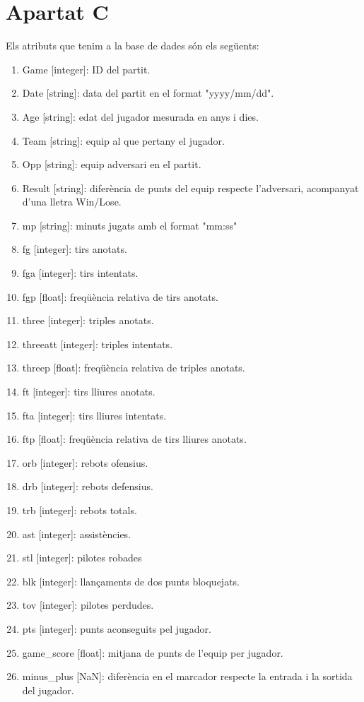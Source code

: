 \documentclass{article}
\begin{document}
\section*{Apartat C}
Els atributs que tenim a la base de dades són els següents:
\begin{enumerate}
	\addtocounter{enumi}{-1}
	\item Game [integer]: ID del partit.
	\item Date [string]: data del partit en el format "yyyy/mm/dd".
	\item Age [string]: edat del jugador mesurada en anys i dies.
	\item Team [string]: equip al que pertany el jugador. 
	\item Opp [string]: equip adversari en el partit.
	\item Result [string]: diferència de punts del equip respecte l'adversari, acompanyat d'una lletra Win/Lose.
	\item mp [string]: minuts jugats amb el format "mm:ss"
	\item fg [integer]: tirs anotats.
	\item fga [integer]: tirs intentats.
	\item fgp [float]: freqüència relativa de tirs anotats.
	\item three [integer]: triples anotats.
	\item threeatt [integer]: triples intentats.
	\item threep [float]: freqüència relativa de triples anotats.
	\item ft [integer]: tirs lliures anotats.
	\item fta [integer]: tirs lliures intentats.
	\item ftp [float]: freqüència relativa de tirs lliures anotats.
	\item orb [integer]: rebots ofensius.
	\item drb [integer]: rebots defensius.
	\item trb [integer]: rebots totals.
	\item ast [integer]: assistències.
	\item stl [integer]: pilotes robades
	\item blk [integer]: llançaments de dos punts bloquejats.
	\item tov [integer]: pilotes perdudes.
	\item pts [integer]: punts aconseguits pel jugador.
	\item game\_score [float]: mitjana de punts de l'equip per jugador.
	\item minus\_plus [NaN]: diferència en el marcador respecte la entrada i la sortida del jugador.
\end{enumerate}
\end{document}

